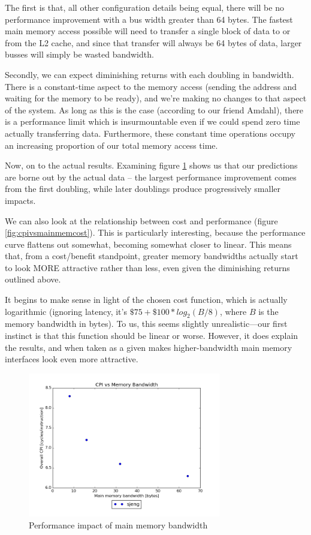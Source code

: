 \documentclass{article}
\begin{document}
The first is that, all other configuration details being equal, there will be no
performance improvement with a bus width greater than 64 bytes. The fastest main
memory access possible will need to transfer a single block of data to or from
the L2 cache, and since that transfer will always be 64 bytes of data, larger
busses will simply be wasted bandwidth.

Secondly, we can expect diminishing returns with each doubling in bandwidth.
There is a constant-time aspect to the memory access (sending the address and
waiting for the memory to be ready), and we're making no changes to that aspect
of the system. As long as this is the case (according to our friend Amdahl),
there is a performance limit which is insurmountable even if we could spend zero
time actually transferring data. Furthermore, these constant time operations
occupy an increasing proportion of our total memory access time.

Now, on to the actual results. Examining figure \ref{fig:cpivsband} shows us
that our predictions are borne out by the actual data -- the largest performance
improvement comes from the first doubling, while later doublings produce
progressively smaller impacts.

We can also look at the relationship between cost and performance (figure
\ref{fig:cpivsmainmemcost}). This is particularly interesting, because the
performance curve flattens out somewhat, becoming somewhat closer to linear.
This means that, from a cost/benefit standpoint, greater memory bandwidths
actually start to look MORE attractive rather than less, even given the
diminishing returns outlined above.

It begins to make sense in light of the chosen cost function, which is actually
logarithmic (ignoring latency, it's $\$75 + \$100*log_2(B / 8)$, where $B$ is
the memory bandwidth in bytes). To us, this seems slightly unrealistic---our
first instinct is that this function should be linear or worse. However, it does
explain the results, and when taken as a given makes higher-bandwidth main
memory interfaces look even more attractive.

\begin{figure}[ht]
    \centering
    \includegraphics[width=0.75\textwidth]{plots/CPI_vs_Bandwidth.png}
    \caption{Performance impact of main memory bandwidth}
    \label{fig:cpivsband}
\end{figure}
\end{document}
